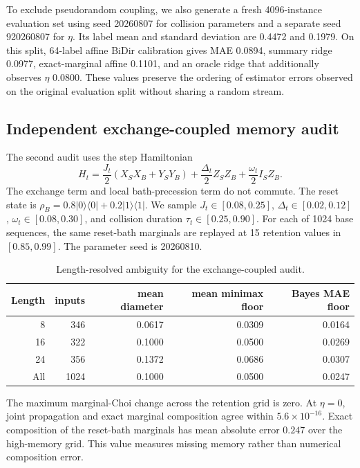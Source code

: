 \documentclass[10pt]{article}
\begin{document}
To exclude pseudorandom coupling, we also generate a fresh 4096-instance evaluation set using seed 20260807 for collision parameters and a separate seed 920260807 for $\eta$. Its label mean and standard deviation are 0.4472 and 0.1979. On this split, 64-label affine BiDir calibration gives MAE 0.0894, summary ridge 0.0977, exact-marginal affine 0.1101, and an oracle ridge that additionally observes $\eta$ 0.0800. These values preserve the ordering of estimator errors observed on the original evaluation split without sharing a random stream.

\subsection{Independent exchange-coupled memory audit}
The second audit uses the step Hamiltonian
\begin{equation}
H_t=\frac{J_t}{2}(X_SX_B+Y_SY_B)
+\frac{\Delta_t}{2}Z_SZ_B
+\frac{\omega_t}{2}I_SZ_B.
\end{equation}
The exchange term and local bath-precession term do not commute. The reset state is $\rho_B=0.8|0\rangle\langle0|+0.2|1\rangle\langle1|$. We sample $J_t\in[0.08,0.25]$, $\Delta_t\in[0.02,0.12]$, $\omega_t\in[0.08,0.30]$, and collision duration $\tau_t\in[0.25,0.90]$. For each of 1024 base sequences, the same reset-bath marginals are replayed at 15 retention values in $[0.85,0.99]$. The parameter seed is 20260810.

\begin{table}[h]
\centering
\caption{Length-resolved ambiguity for the exchange-coupled audit.}
\label{tab:supp_exchange_audit}
\begin{tabular}{rrrrr}
\toprule
Length & inputs & mean diameter & mean minimax floor & Bayes MAE floor \\
\midrule
8  & 346 & 0.0617 & 0.0309 & 0.0164 \\
16 & 322 & 0.1000 & 0.0500 & 0.0269 \\
24 & 356 & 0.1372 & 0.0686 & 0.0307 \\
\midrule
All & 1024 & 0.1000 & 0.0500 & 0.0247 \\
\bottomrule
\end{tabular}
\end{table}

The maximum marginal-Choi change across the retention grid is zero. At $\eta=0$, joint propagation and exact marginal composition agree within $5.6\times10^{-16}$. Exact composition of the reset-bath marginals has mean absolute error $0.247$ over the high-memory grid. This value measures missing memory rather than numerical composition error.
\end{document}
